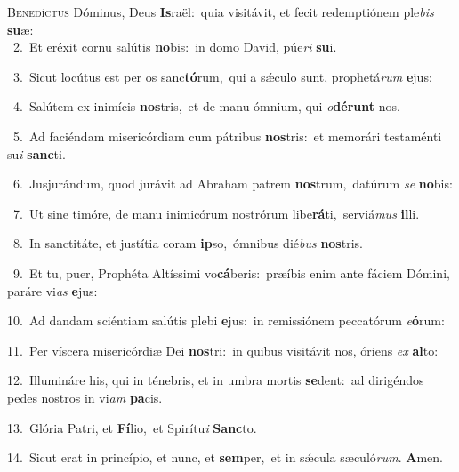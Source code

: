 \lettrine{\initial\textcolor{\initialcolor}{B}}{enedíctus} Dóminus, Deus \textbf{Is}\-raël:~\star quia visitávit, et fecit redemptiónem ple\textit{bis} \textbf{su}\-æ:\\
{\numbfont\textcolor{\numbcolor}{~2.}}~Et eréxit cornu salútis \textbf{no}\-bis:~\star in domo David, púe\textit{ri} \textbf{su}\-i.\par
{\numbfont\textcolor{\numbcolor}{~3.}}~Sicut locútus est per os sanc\-\textbf{tó}\-rum,~\star qui a sǽculo sunt, prophetá\textit{rum} \textbf{e}\-jus:\par
{\numbfont\textcolor{\numbcolor}{~4.}}~Salútem ex inimícis \textbf{nos}\-tris,~\star et de manu ómnium, qui \textit{o}\-\textbf{dé}\textbf{runt} nos.\par
{\numbfont\textcolor{\numbcolor}{~5.}}~Ad faciéndam misericórdiam cum pátribus \textbf{nos}\-tris:~\star et memorári testaménti su\textit{i} \textbf{sanc}\-ti.\par
{\numbfont\textcolor{\numbcolor}{~6.}}~Jusjurándum, quod jurávit ad Abraham patrem \textbf{nos}\-trum,~\star datúrum \textit{se} \textbf{no}\-bis:\par
{\numbfont\textcolor{\numbcolor}{~7.}}~Ut sine timóre, de manu inimicórum nostrórum libe\-\textbf{rá}\-ti,~\star serviá\textit{mus} \textbf{il}\-li.\par
{\numbfont\textcolor{\numbcolor}{~8.}}~In sanctitáte, et justítia coram \textbf{ip}\-so,~\star ómnibus dié\textit{bus} \textbf{nos}\-tris.\par
{\numbfont\textcolor{\numbcolor}{~9.}}~Et tu, puer, Prophéta Altíssimi vo\-\textbf{cá}\-beris:~\star præíbis enim ante fáciem Dómini, paráre vi\textit{as} \textbf{e}\-jus:\par
{\numbfont\textcolor{\numbcolor}{10.}}~Ad dandam sciéntiam salútis plebi \textbf{e}\-jus:~\star in remissiónem peccatórum \textit{e}\-\textbf{ó}rum:\par
{\numbfont\textcolor{\numbcolor}{11.}}~Per víscera misericórdiæ Dei \textbf{nos}\-tri:~\star in quibus visitávit nos, óriens \textit{ex} \textbf{al}\-to:\par
{\numbfont\textcolor{\numbcolor}{12.}}~Illumináre his, qui in ténebris, et in umbra mortis \textbf{se}\-dent:~\star ad dirigéndos pedes nostros in vi\textit{am} \textbf{pa}\-cis.\par
{\numbfont\textcolor{\numbcolor}{13.}}~Glória Patri, et \textbf{Fí}\-lio,~\star et Spirítu\textit{i} \textbf{Sanc}\-to.\par
{\numbfont\textcolor{\numbcolor}{14.}}~Sicut erat in princípio, et nunc, et \textbf{sem}\-per,~\star et in sǽcula sæculó\-\textit{rum}\-. \textbf{A}\-men.\par
